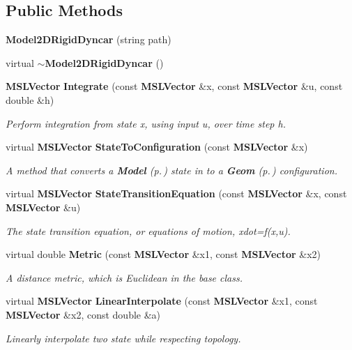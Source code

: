 \subsection*{Public Methods}
\begin{CompactItemize}
\item 
{\bf Model2DRigid\-Dyncar} (string path)
\item 
virtual {\bf $\sim$Model2DRigid\-Dyncar} ()
\item 
{\bf MSLVector} {\bf Integrate} (const {\bf MSLVector} \&x, const {\bf MSLVector} \&u, const double \&h)
\begin{CompactList}\small\item\em Perform integration from state x, using input u, over time step h.\item\end{CompactList}\item 
virtual {\bf MSLVector} {\bf State\-To\-Configuration} (const {\bf MSLVector} \&x)
\begin{CompactList}\small\item\em A method that converts a {\bf Model} {\rm (p.\,\pageref{classModel})} state in to a {\bf Geom} {\rm (p.\,\pageref{classGeom})} configuration.\item\end{CompactList}\item 
virtual {\bf MSLVector} {\bf State\-Transition\-Equation} (const {\bf MSLVector} \&x, const {\bf MSLVector} \&u)
\begin{CompactList}\small\item\em The state transition equation, or equations of motion, xdot=f(x,u).\item\end{CompactList}\item 
virtual double {\bf Metric} (const {\bf MSLVector} \&x1, const {\bf MSLVector} \&x2)
\begin{CompactList}\small\item\em A distance metric, which is Euclidean in the base class.\item\end{CompactList}\item 
virtual {\bf MSLVector} {\bf Linear\-Interpolate} (const {\bf MSLVector} \&x1, const {\bf MSLVector} \&x2, const double \&a)
\begin{CompactList}\small\item\em Linearly interpolate two state while respecting topology.\item\end{CompactList}\end{CompactItemize}
